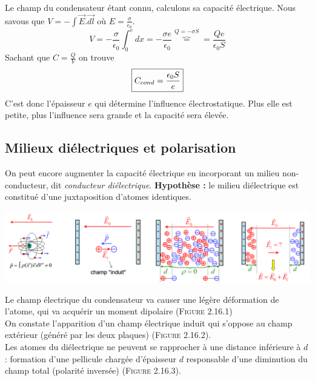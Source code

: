 \documentclass	[11pt, a4paper, openany]{book}
\begin{document}
Le champ du condensateur étant connu, calculons sa capacité électrique. Nous savous que $V = - \int \vec{E}.\vec{dl}$ où $E = \frac{\sigma}{\epsilon_0}$.
\begin{equation}
V = -\frac{\sigma}{\epsilon_0}\int_0^e dx = -\frac{\sigma e}{\epsilon_0} \overbrace{=}^{Q = -\sigma S} = \frac{Qe}{\epsilon_0 S}
\end{equation}
Sachant que $C = \frac{Q}{V}$ on trouve
\begin{equation}
\fbox{$C_{cond} = \dfrac{\epsilon_0 S}{e}$}
\end{equation}
C'est donc l'épaisseur $e$ qui détermine l'influence électrostatique. Plus elle est petite, plus l'influence sera grande et la capacité sera élevée.

\subsection{Milieux diélectriques et polarisation}
On peut encore augmenter la capacité électrique en incorporant un milieu non-conducteur, dit \textit{conducteur diélectrique}. \textbf{Hypothèse :} le milieu diélectrique est constitué d'une juxtaposition d'atomes identiques.
\begin{center}
\includegraphics[scale=0.48]{es/image16.png}
\end{center}
Le champ électrique du condensateur va causer une légère déformation de l'atome, qui va acquérir un moment dipolaire (\textsc{Figure 2.16.1})\\
On constate l'apparition d'un champ électrique induit qui s'oppose au champ extérieur (généré par les deux plaques) (\textsc{Figure 2.16.2}).\\

Les atomes du diélectrique ne peuvent se rapprocher à une distance inférieure à $d$ : formation d'une pellicule chargée d'épaisseur $d$ responsable d'une diminution du champ total (polarité inversée) (\textsc{Figure 2.16.3}).\\
\end{document}
